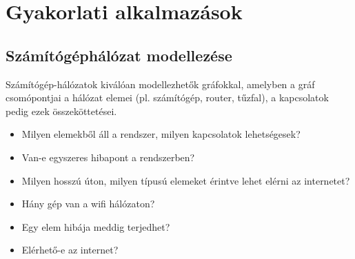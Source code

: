 %
%
%
%
%
%
%	
%	
%
%
%
%
%

\section{Gyakorlati alkalmazások}

\subsection{Számítógéphálózat modellezése}

Számítógép-hálózatok kiválóan modellezhetők gráfokkal, amelyben a gráf csomópontjai a hálózat elemei (pl. számítógép, router, tűzfal), a kapcsolatok pedig ezek összeköttetései.


\begin{itemize}
	\item Milyen elemekből áll a rendszer, milyen kapcsolatok lehetségesek?
	\item Van-e egyszeres hibapont a rendszerben?
	\item Milyen hosszú úton, milyen típusú elemeket érintve lehet elérni az internetet?
	\item Hány gép van a wifi hálózaton?
	\item Egy elem hibája meddig terjedhet?
	\item Elérhető-e az internet?
\end{itemize}


